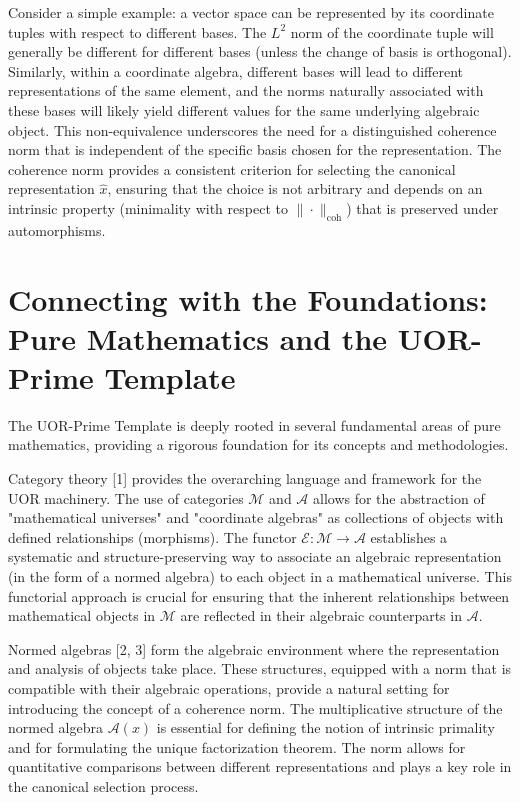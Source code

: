 \documentclass{article}
\begin{document}
Consider a simple example: a vector space can be represented by its coordinate tuples with respect to different bases. The $L^2$ norm of the coordinate tuple will generally be different for different bases (unless the change of basis is orthogonal). Similarly, within a coordinate algebra, different bases will lead to different representations of the same element, and the norms naturally associated with these bases will likely yield different values for the same underlying algebraic object. This non-equivalence underscores the need for a distinguished coherence norm that is independent of the specific basis chosen for the representation. The coherence norm provides a consistent criterion for selecting the canonical representation $\hat{x}$, ensuring that the choice is not arbitrary and depends on an intrinsic property (minimality with respect to $\|\cdot\|_{\mathrm{coh}}$) that is preserved under automorphisms.

\section{Connecting with the Foundations: Pure Mathematics and the UOR-Prime Template}

The UOR-Prime Template is deeply rooted in several fundamental areas of pure mathematics, providing a rigorous foundation for its concepts and methodologies.

Category theory [1] provides the overarching language and framework for the UOR machinery. The use of categories $\mathcal{M}$ and $\mathcal{A}$ allows for the abstraction of "mathematical universes" and "coordinate algebras" as collections of objects with defined relationships (morphisms). The functor $\mathcal{E} : \mathcal{M} \to \mathcal{A}$ establishes a systematic and structure-preserving way to associate an algebraic representation (in the form of a normed algebra) to each object in a mathematical universe. This functorial approach is crucial for ensuring that the inherent relationships between mathematical objects in $\mathcal{M}$ are reflected in their algebraic counterparts in $\mathcal{A}$.

Normed algebras [2, 3] form the algebraic environment where the representation and analysis of objects take place. These structures, equipped with a norm that is compatible with their algebraic operations, provide a natural setting for introducing the concept of a coherence norm. The multiplicative structure of the normed algebra $\mathcal{A}(x)$ is essential for defining the notion of intrinsic primality and for formulating the unique factorization theorem. The norm allows for quantitative comparisons between different representations and plays a key role in the canonical selection process.
\end{document}
